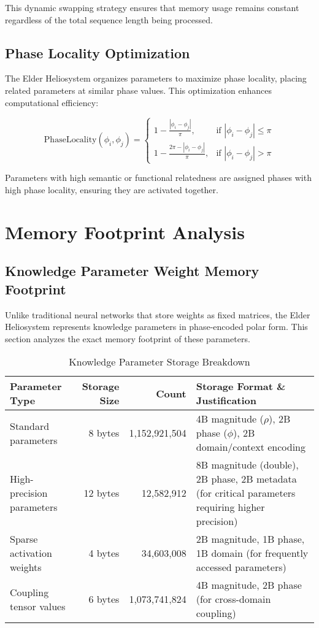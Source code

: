 This dynamic swapping strategy ensures that memory usage remains constant regardless of the total sequence length being processed.

\subsection{Phase Locality Optimization}

The Elder Heliosystem organizes parameters to maximize phase locality, placing related parameters at similar phase values. This optimization enhances computational efficiency:

\begin{equation}
\text{PhaseLocality}(\phi_i, \phi_j) = \begin{cases}
1 - \frac{|\phi_i - \phi_j|}{\pi}, & \text{if } |\phi_i - \phi_j| \leq \pi \\
1 - \frac{2\pi - |\phi_i - \phi_j|}{\pi}, & \text{if } |\phi_i - \phi_j| > \pi
\end{cases}
\end{equation}

Parameters with high semantic or functional relatedness are assigned phases with high phase locality, ensuring they are activated together.

\section{Memory Footprint Analysis}

\subsection{Knowledge Parameter Weight Memory Footprint}

Unlike traditional neural networks that store weights as fixed matrices, the Elder Heliosystem represents knowledge parameters in phase-encoded polar form. This section analyzes the exact memory footprint of these parameters.

\begin{table}[h]
\centering
\small
\begin{tabular}{|l|r|r|p{6cm}|}
\hline
\textbf{Parameter Type} & \textbf{Storage Size} & \textbf{Count} & \textbf{Storage Format \& Justification} \\
\hline
Standard parameters & 8 bytes & 1,152,921,504 & 4B magnitude ($\rho$), 2B phase ($\phi$), 2B domain/context encoding \\
\hline
High-precision parameters & 12 bytes & 12,582,912 & 8B magnitude (double), 2B phase, 2B metadata (for critical parameters requiring higher precision) \\
\hline
Sparse activation weights & 4 bytes & 34,603,008 & 2B magnitude, 1B phase, 1B domain (for frequently accessed parameters) \\
\hline
Coupling tensor values & 6 bytes & 1,073,741,824 & 4B magnitude, 2B phase (for cross-domain coupling) \\
\hline
\end{tabular}
\caption{Knowledge Parameter Storage Breakdown}
\end{table}


